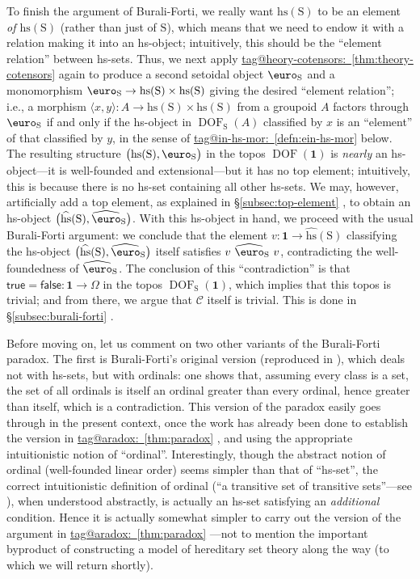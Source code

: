 \documentclass{amsart}
\makeatletter
\newcommand\br[1]{\langle{}#1\rangle{}}
\newcommand\cC{\mathcal{C}}
\newcommand\DOF{\operatorname{DOF}}
\newcommand\Ein{\mathrel{\text{\textup{\euro}}}}
\newcommand\hs{\mathrm{hs}}
\newcommand\pbig[1]{\big({#1}\big)}
\newcommand\rS{\mathrm{S}}
\newcommand\tm{\mathbf{1}}
\newcommand\unEin{{\Ein}}
\newcommand\wh[1]{\widehat{#1}}
\newcommand\tagword[1]{\csname tag@#1\endcsname}
\def\label@tag#1:#2\@nil{#1}
\newcommand\labeltag[1]{\label@tag#1:\@nil}
\newcommand\jref[1]{%
  \texorpdfstring%
    {\hyperref[#1]{\tagword{\labeltag{#1}}~\ref*{#1}}}%
    {\tagword{\labeltag{#1}}~\ref*{#1}}%
}
\newcommand\prerefpost[3]{%
  \texorpdfstring%
    {\hyperref[#2]{#1\ref*{#2}#3}}%
    {#1\ref*{#2}#3}%
}
\newcommand\sref[1]{\prerefpost{\S}{#1}{}}
\theoremstyle{definition}
\theoremstyle{remark}
\theoremstyle{plainwithref}
\makeatother
\begin{document}
To finish the argument of Burali-Forti, we really want \( \hs(\rS) \) to be an element \emph{of \( \hs(\rS) \)} (rather than just of \( \rS \)), which means that we need to endow it with a relation making it into an hs-object; intuitively, this should be the ``element relation'' between hs-sets.
Thus, we next apply \jref{thm:theory-cotensors} again to produce a second setoidal object \( \unEin_\rS \) and a monomorphism \( \unEin_\rS \to \hs(\rS) \times \hs(\rS) \) giving the desired ``element relation''; i.e., a morphism \( \br{x,y} \colon A \to \hs(\rS) \times \hs(\rS) \) from a groupoid \( A \) factors through \( \unEin_\rS \) if and only if the hs-object in \( \DOF_\rS(A) \) classified by \( x \) is an ``element'' of that classified by \( y \), in the sense of \jref{defn:ein-hs-mor} below.
The resulting structure \( \pbig{\hs(\rS), \Ein_\rS} \) in the topos \( \DOF(\tm) \) is \emph{nearly} an hs-object---it is well-founded and extensional---but it has no top element; intuitively, this is because there is no hs-set containing all other hs-sets.
We may, however, artificially add a top element, as explained in \sref{subsec:top-element}, to obtain an hs-object \( \pbig{\wh \hs(\rS), \wh{\unEin}_\rS} \).
With this hs-object in hand, we proceed with the usual Burali-Forti argument: we conclude that the element \( v \colon \tm \to \wh \hs(\rS) \) classifying the hs-object \( \pbig{\wh \hs(\rS), \wh \Ein_\rS} \) itself satisfies \( v\ \wh \Ein_{\rS}\ v \), contradicting the well-foundedness of \( \wh \unEin_{\rS} \).
The conclusion of this ``contradiction'' is that \( \mathsf{true} = \mathsf{false} \colon \tm \to \Omega \) in the topos \( \DOF_\rS(\tm) \), which implies that this topos is trivial; and from there, we argue that \( \cC \) itself is trivial.
This is done in \sref{subsec:burali-forti}.

Before moving on, let us comment on two other variants of the Burali-Forti paradox.
The first is Burali-Forti's original version (reproduced in \cite{heijenoort-frege-to-godel}), which deals not with hs-sets, but with ordinals: one shows that, assuming every class is a set, the set of all ordinals is itself an ordinal greater than every ordinal, hence greater than itself, which is a contradiction.
This version of the paradox easily goes through in the present context, once the work has already been done to establish the version in \jref{thm:paradox}, and using the appropriate intuitionistic notion of ``ordinal''.
Interestingly, though the abstract notion of ordinal (well-founded linear order) seems simpler than that of ``hs-set'', the correct intuitionistic definition of ordinal (``a transitive set of transitive sets''---see \cite{powell-extending-godels-negative}), when understood abstractly, is actually an hs-set satisfying an \emph{additional} condition.
Hence it is actually somewhat simpler to carry out the version of the argument in \jref{thm:paradox}---not to mention the important byproduct of constructing a model of hereditary set theory along the way (to which we will return shortly).
\end{document}
